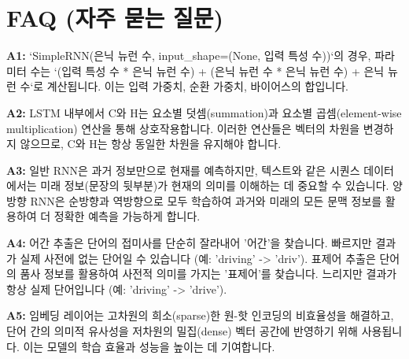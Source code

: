 \documentclass[11pt,a4paper]{article}
\begin{document}
\newpage
\section*{FAQ (자주 묻는 질문)}

\begin{tcolorbox}[title=\textbf{Q1: RNN 파라미터 계산은 어떻게 하나요?}, colback=myyellow!5!white, colframe=myyellow!75!black]
\textbf{A1:} `SimpleRNN(은닉 뉴런 수, input_shape=(None, 입력 특성 수))`의 경우, 파라미터 수는 `(입력 특성 수 * 은닉 뉴런 수) + (은닉 뉴런 수 * 은닉 뉴런 수) + 은닉 뉴런 수`로 계산됩니다. 이는 입력 가중치, 순환 가중치, 바이어스의 합입니다.
\end{tcolorbox}

\begin{tcolorbox}[title=\textbf{Q2: LSTM의 셀 상태(C)와 은닉 상태(H)는 왜 같은 차원인가요?}, colback=myyellow!5!white, colframe=myyellow!75!black]
\textbf{A2:} LSTM 내부에서 C와 H는 요소별 덧셈(summation)과 요소별 곱셈(element-wise multiplication) 연산을 통해 상호작용합니다. 이러한 연산들은 벡터의 차원을 변경하지 않으므로, C와 H는 항상 동일한 차원을 유지해야 합니다.
\end{tcolorbox}

\begin{tcolorbox}[title=\textbf{Q3: 양방향 RNN은 왜 필요한가요?}, colback=myyellow!5!white, colframe=myyellow!75!black]
\textbf{A3:} 일반 RNN은 과거 정보만으로 현재를 예측하지만, 텍스트와 같은 시퀀스 데이터에서는 미래 정보(문장의 뒷부분)가 현재의 의미를 이해하는 데 중요할 수 있습니다. 양방향 RNN은 순방향과 역방향으로 모두 학습하여 과거와 미래의 모든 문맥 정보를 활용하여 더 정확한 예측을 가능하게 합니다.
\end{tcolorbox}

\begin{tcolorbox}[title=\textbf{Q4: 어간 추출(Stemming)과 표제어 추출(Lemmatization)의 차이는 무엇인가요?}, colback=myyellow!5!white, colframe=myyellow!75!black]
\textbf{A4:} 어간 추출은 단어의 접미사를 단순히 잘라내어 '어간'을 찾습니다. 빠르지만 결과가 실제 사전에 없는 단어일 수 있습니다 (예: 'driving' -> 'driv'). 표제어 추출은 단어의 품사 정보를 활용하여 사전적 의미를 가지는 '표제어'를 찾습니다. 느리지만 결과가 항상 실제 단어입니다 (예: 'driving' -> 'drive').
\end{tcolorbox}

\begin{tcolorbox}[title=\textbf{Q5: 임베딩 레이어는 왜 사용하나요?}, colback=myyellow!5!white, colframe=myyellow!75!black]
\textbf{A5:} 임베딩 레이어는 고차원의 희소(sparse)한 원-핫 인코딩의 비효율성을 해결하고, 단어 간의 의미적 유사성을 저차원의 밀집(dense) 벡터 공간에 반영하기 위해 사용됩니다. 이는 모델의 학습 효율과 성능을 높이는 데 기여합니다.
\end{tcolorbox}
\end{document}
